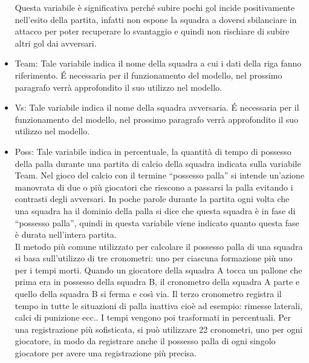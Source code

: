 \begin{itemize}
	Questa variabile è significativa perché subire pochi gol incide positivamente nell'esito della partita, infatti non espone la squadra a doversi sbilanciare in attacco per poter recuperare lo svantaggio e quindi non rischiare di subire altri gol dai avversari.
	\item \textsf{Team}: Tale variabile indica il nome della squadra a cui i dati della riga fanno riferimento. É necessaria per il funzionamento del modello, nel prossimo paragrafo verrà approfondito il suo utilizzo nel modello.
	\item \textsf{Vs}: Tale variabile indica il nome della squadra avversaria. É necessaria per il funzionamento del modello, nel prossimo paragrafo verrà approfondito il suo utilizzo nel modello.
	\item \textsf{Poss}: Tale variabile indica in percentuale, la quantità di tempo di possesso della palla durante una partita di calcio della squadra indicata sulla variabile \textsf{Team}. Nel gioco del calcio con il termine “possesso palla” si intende un’azione manovrata di due o più giocatori che riescono a passarsi la palla evitando i contrasti degli avversari. In poche parole durante la partita ogni volta che una squadra ha il dominio della palla si dice che questa squadra è in fase di “possesso palla”, quindi in questa variabile viene indicato quanto questa fase è durata nell'intera partita.\\
	Il metodo più comune utilizzato per calcolare il possesso palla di una squadra si basa sull'utilizzo di tre cronometri: uno per ciascuna formazione più uno per i tempi morti. Quando un giocatore della squadra A tocca un pallone che prima era in possesso della squadra B, il cronometro della squadra A parte e quello della squadra B si ferma e così via. Il terzo cronometro registra il tempo in tutte le situazioni di palla inattiva cioè ad esempio: rimesse laterali, calci di punizione ecc.. I tempi vengono poi trasformati in percentuali. Per una registrazione più sofisticata, si può utilizzare 22 cronometri, uno per ogni giocatore, in modo da registrare anche il possesso palla di ogni singolo giocatore per avere una registrazione più precisa.
	

\end{itemize}
